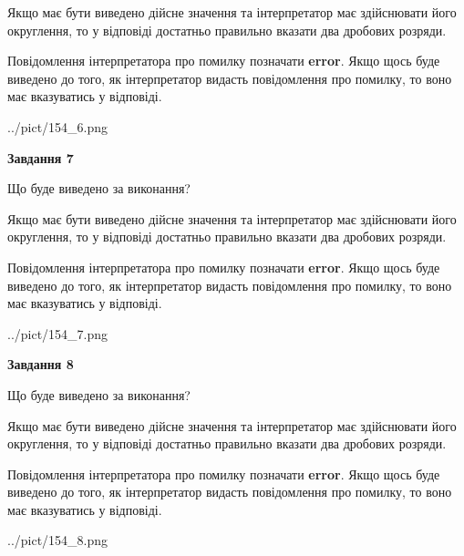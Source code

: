 \documentclass[12pt, ukrainian]{article}
\begin{document}
{\begin {Large}
Якщо має бути виведено дійсне значення та інтерпретатор має здійснювати його округлення, 
то у відповіді достатньо правильно вказати два дробових розряди.

Повідомлення інтерпретатора про помилку позначати \textbf{error}.
Якщо щось буде виведено до того, як інтерпретатор видасть повідомлення про помилку, 
то воно має вказуватись у відповіді. \par

\begin{center}
	{../pict/154_6.png}
\end{center}
\newpage

{\begin {center}\textbf{Завдання 7}\end {center}}\par
Що буде виведено за виконання? \par

Якщо має бути виведено дійсне значення та інтерпретатор має здійснювати його округлення, 
то у відповіді достатньо правильно вказати два дробових розряди.

Повідомлення інтерпретатора про помилку позначати \textbf{error}.
Якщо щось буде виведено до того, як інтерпретатор видасть повідомлення про помилку, 
то воно має вказуватись у відповіді. \par

\begin{center}
	{../pict/154_7.png}
\end{center}
\newpage

{\begin {center}\textbf{Завдання 8}\end {center}}\par
Що буде виведено за виконання? \par

Якщо має бути виведено дійсне значення та інтерпретатор має здійснювати його округлення, 
то у відповіді достатньо правильно вказати два дробових розряди.

Повідомлення інтерпретатора про помилку позначати \textbf{error}.
Якщо щось буде виведено до того, як інтерпретатор видасть повідомлення про помилку, 
то воно має вказуватись у відповіді. \par

\begin{center}
	{../pict/154_8.png}
\end{center}
\newpage


\end{Large}}
\end{document}
